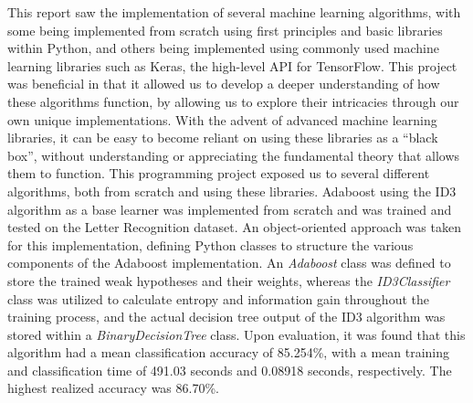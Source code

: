 \documentclass[a4paper]{article}
\begin{document}
This report saw the implementation of several machine learning algorithms, with some being implemented from scratch using first principles and basic libraries within Python, and others being implemented using commonly used machine learning libraries such as Keras, the high-level API for TensorFlow. This project was beneficial in that it allowed us to develop a deeper understanding of how these algorithms function, by allowing us to explore their intricacies through our own unique implementations. With the advent of advanced machine learning libraries, it can be easy to become reliant on using these libraries as a ``black box'', without understanding or appreciating the fundamental theory that allows them to function. This programming project exposed us to several different algorithms, both from scratch and using these libraries. Adaboost using the ID3 algorithm as a base learner was implemented from scratch and was trained and tested on the Letter Recognition dataset. An object-oriented approach was taken for this implementation, defining Python classes to structure the various components of the Adaboost implementation. An \textit{Adaboost} class was defined to store the trained weak hypotheses and their weights, whereas the \textit{ID3Classifier} class was utilized to calculate entropy and information gain throughout the training process, and the actual decision tree output of the ID3 algorithm was stored within a \textit{BinaryDecisionTree} class. Upon evaluation, it was found that this algorithm had a mean classification accuracy of 85.254\%, with a mean training and classification time of 491.03 seconds and 0.08918 seconds, respectively. The highest realized accuracy was 86.70\%.
\end{document}
